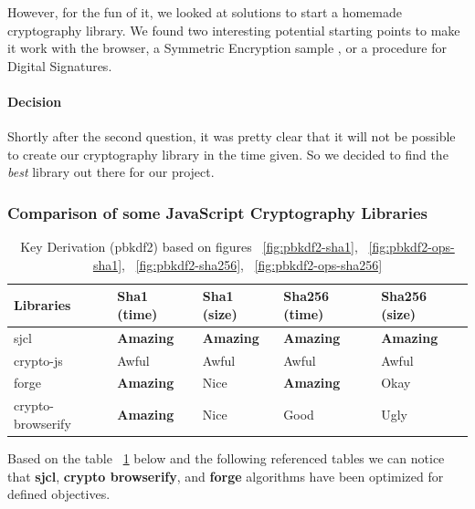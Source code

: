 However, for the fun of it, we looked at solutions to start a homemade cryptography library. We found two interesting potential starting points to make it work with the browser, a Symmetric Encryption sample \cite{InfoTech2014SymmetricSample}, or a procedure for Digital Signatures\cite{InfoTech2014DigitalBrowser}.

\paragraph{Decision} Shortly after the second question, it was pretty clear that it will not be possible to create our cryptography library in the time given. So we decided to find the \textit{best} library out there for our project.

\subsubsection{Comparison of some JavaScript Cryptography Libraries}
\begin{table}[htpb]
\centering
\caption{Key Derivation (pbkdf2) based on figures ~\ref{fig:pbkdf2-sha1}, ~\ref{fig:pbkdf2-ops-sha1}, ~\ref{fig:pbkdf2-sha256}, ~\ref{fig:pbkdf2-ops-sha256}}
\label{tab:key-derivation-pbkdf2}
\begin{adjustbox}{center, width=\columnwidth-20pt}
\begin{tabular}{|l|l|l|l|l|}
\hline
Libraries & Sha1 (time) & Sha1 (size) & Sha256 (time) & Sha256 (size)    \\ \hline
sjcl                & \textbf{Amazing}    & \textbf{Amazing}    & \textbf{Amazing}     & \textbf{Amazing}        \\ \hline
crypto-js            & Awful    & Awful    & Awful    & Awful        \\ \hline
forge                & \textbf{Amazing}    & Nice        & \textbf{Amazing}    & Okay                \\ \hline
crypto-browserify    & \textbf{Amazing}    & Nice        & Good        & Ugly            \\ \hline
\end{tabular}
\end{adjustbox}
\end{table}

Based on the table ~\ref{tab:key-derivation-pbkdf2} below and the following referenced tables we can notice that \textbf{sjcl}\cite{Stark2009SymmetricJavascript}, \textbf{crypto browserify}\cite{Tarr2013Crypto-Browserify}, and \textbf{forge}\cite{DigitalBazaar2016Forge} algorithms have been optimized for defined objectives.

